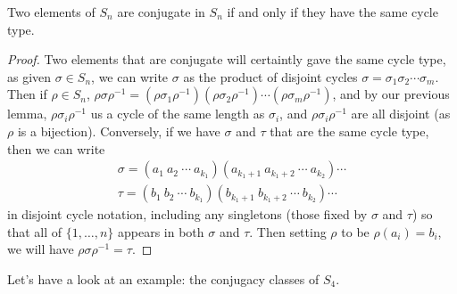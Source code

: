 \begin{proposition}
	Two elements of $S_n$ are conjugate in $S_n$ if and only if they have the same cycle type.
\end{proposition}
\begin{proof}
	Two elements that are conjugate will certaintly gave the same cycle type, as given
	$\sigma \in S_n$, we can write $\sigma$ as the product of disjoint cycles $\sigma = \sigma_1 \sigma_2 \cdots \sigma_m$. Then if $\rho \in S_n$, $\rho \sigma \rho^{-1} = (\rho \sigma_1 \rho^{-1}) (\rho \sigma_2 \rho^{-1}) \cdots  (\rho \sigma_m \rho^{-1})$, and by our previous lemma, $\rho \sigma_i \rho^{-1}$ us a cycle of the same length as $\sigma_i$, and $\rho \sigma_i \rho^{-1}$ are all disjoint (as $\rho$ is a bijection).
	Conversely, if we have $\sigma$ and $\tau$ that are the same cycle type, then we can write
	\begin{align*}
		\sigma = (a_1\ a_2\ \cdots\ a_{k_1})(a_{k_1 + 1}\ a_{k_1 + 2}\ \cdots\ a_{k_2}) \cdots \\
		\tau = (b_1\ b_2\ \cdots\ b_{k_1})(b_{k_1 + 1}\ b_{k_1 + 2}\ \cdots\ b_{k_2}) \cdots
	\end{align*}
	in disjoint cycle notation, including any singletons (those fixed by $\sigma$ and $\tau$) so that all of $\{1, \dots, n\}$ appears in both $\sigma$ and $\tau$. Then setting $\rho$
 to be $\rho(a_i) = b_i$, we will have $\rho \sigma \rho^{-1} = \tau$.
\end{proof}

Let's have a look at an example: the conjugacy classes of $S_4$.

